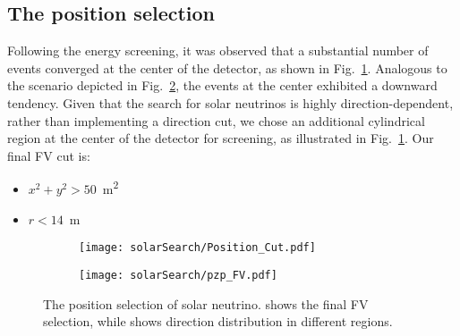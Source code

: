 \subsection{The position selection}
Following the energy screening, it was observed that a substantial number of events converged at the center of the detector, as shown in Fig.~\ref{fig:solar_pos_cut}. Analogous to the scenario depicted in Fig.~\ref{fig:solar_direction}, the events at the center exhibited a downward tendency. Given that the search for solar neutrinos is highly direction-dependent, rather than implementing a direction cut, we chose an additional cylindrical region at the center of the detector for screening, as illustrated in Fig.~\ref{fig:solar_pos_cut}. Our final FV cut is:
\begin{itemize}
	\item $x^2+y^2>50$~\si{m^2}
	\item $r<14$~\si{m}
\end{itemize}

\begin{figure}[htbp]
	\centering
	\begin{subfigure}{0.5\textwidth}
		\centering
		\texttt{[image: solarSearch/Position\_Cut.pdf]}
		\caption{}
		\label{fig:solar_pos_cut}
	\end{subfigure}%
	\begin{subfigure}{0.5\textwidth}
		\centering
		\texttt{[image: solarSearch/pzp\_FV.pdf]}
		\caption{}
		\label{fig:solar_direction}
	\end{subfigure}
	\caption{The position selection of solar neutrino.  shows the final FV selection, while  shows direction distribution in different regions.}
	\label{fig:solar_position_cut}
\end{figure}

